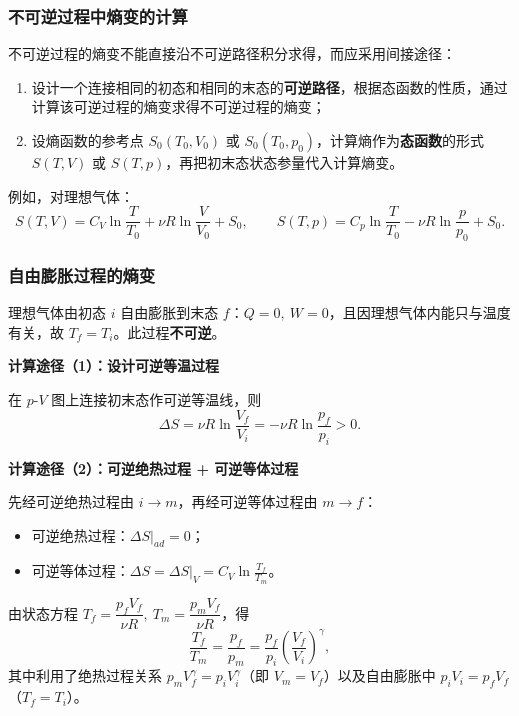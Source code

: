 \documentclass[UTF8]{ctexart}
\theoremstyle{definition}
\begin{document}
\subsubsection*{不可逆过程中熵变的计算}

不可逆过程的熵变不能直接沿不可逆路径积分求得，而应采用间接途径：

\begin{enumerate}
\item 设计一个连接相同的初态和相同的末态的\textbf{可逆路径}，根据态函数的性质，通过计算该可逆过程的熵变求得不可逆过程的熵变；
\item 设熵函数的参考点 $S_0(T_0,V_0)$ 或 $S_0(T_0,p_0)$，计算熵作为\textbf{态函数}的形式 $S(T,V)$ 或 $S(T,p)$，再把初末态状态参量代入计算熵变。
\end{enumerate}

例如，对理想气体：
\begin{equation}
S(T,V)=C_V\ln\frac{T}{T_0}+\nu R\ln\frac{V}{V_0}+S_0,\qquad
S(T,p)=C_p\ln\frac{T}{T_0}-\nu R\ln\frac{p}{p_0}+S_0.
\end{equation}

\subsubsection*{自由膨胀过程的熵变}

理想气体由初态 $i$ 自由膨胀到末态 $f$：$Q=0,\ W=0$，且因理想气体内能只与温度有关，故 $T_f=T_i$。此过程\textbf{不可逆}。

\textbf{计算途径（1）：设计可逆等温过程}

在 $p$-$V$ 图上连接初末态作可逆等温线，则
\begin{equation}
\Delta S=\nu R\ln\frac{V_f}{V_i}=-\nu R\ln\frac{p_f}{p_i}>0.
\end{equation}

\textbf{计算途径（2）：可逆绝热过程 + 可逆等体过程}

先经可逆绝热过程由 $i\to m$，再经可逆等体过程由 $m\to f$：
\begin{itemize}
\item 可逆绝热过程：$\Delta S|_{ad}=0$；
\item 可逆等体过程：$\displaystyle\Delta S=\Delta S|_V=C_V\ln\frac{T_f}{T_m}$。
\end{itemize}

由状态方程 $T_f=\dfrac{p_fV_f}{\nu R},\ T_m=\dfrac{p_mV_f}{\nu R}$，得
\begin{equation}
\frac{T_f}{T_m}=\frac{p_f}{p_m}=\frac{p_f}{p_i}\left(\frac{V_f}{V_i}\right)^{\gamma},
\end{equation}
其中利用了绝热过程关系 $p_mV_f^{\gamma}=p_iV_i^{\gamma}$（即 $V_m=V_f$）以及自由膨胀中 $p_iV_i=p_fV_f$（$T_f=T_i$）。
\end{document}
